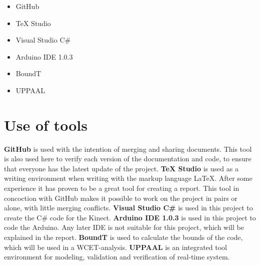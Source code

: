 \begin{itemize}
	\item GitHub
	\item TeX Studio
	\item Visual Studio C\#
	\item Arduino IDE 1.0.3
	\item BoundT
	\item UPPAAL
\end{itemize}

\section*{Use of tools}
\textbf{GitHub} is used with the intention of merging and sharing documents. This tool is also used here to verify each version of the documentation and code, to ensure that everyone has the latest update of the project.\newline
\textbf{TeX Studio} is used as a writing environment when writing with the markup language LaTeX. After some experience it has proven to be a great tool for creating a report. This tool in concoction with GitHub makes it possible to work on the project in pairs or alone, with little merging conflicts. \newline
\textbf{Visual Studio C\#} is used in this project to create the C\# code for the Kinect. \newline
\textbf{Arduino IDE 1.0.3} is used in this project to code the Arduino. Any later IDE is not suitable for this project, which will be explained in the report. \newline
\textbf{BoundT} is used to calculate the bounds of the code, which will be used in a WCET-analysis. \citep{boundt} \newline
\textbf{UPPAAL} is an integrated tool environment for modeling, validation and verification of real-time system. \citep{uppaal}